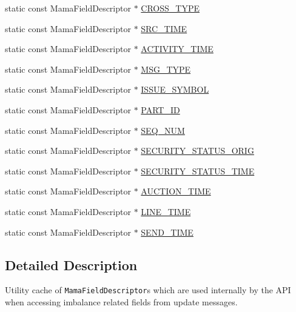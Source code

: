 \begin{CompactItemize}
\item 
static const Mama\-Field\-Descriptor $\ast$ \hyperlink{classWombat_1_1MamdaOrderImbalanceFields_75000c868605f1fb02181c7bf938b1e9}{CROSS\_\-TYPE}
\item 
static const Mama\-Field\-Descriptor $\ast$ \hyperlink{classWombat_1_1MamdaOrderImbalanceFields_6560426768aa3558614e47b458e109ea}{SRC\_\-TIME}
\item 
static const Mama\-Field\-Descriptor $\ast$ \hyperlink{classWombat_1_1MamdaOrderImbalanceFields_cdd3953c18f42d338d29d74f59688759}{ACTIVITY\_\-TIME}
\item 
static const Mama\-Field\-Descriptor $\ast$ \hyperlink{classWombat_1_1MamdaOrderImbalanceFields_74a91e529d9147b008ddfce0608764d5}{MSG\_\-TYPE}
\item 
static const Mama\-Field\-Descriptor $\ast$ \hyperlink{classWombat_1_1MamdaOrderImbalanceFields_b564a837fd932d110b2cde5477df1b6d}{ISSUE\_\-SYMBOL}
\item 
static const Mama\-Field\-Descriptor $\ast$ \hyperlink{classWombat_1_1MamdaOrderImbalanceFields_8cb9096c581c0c13566e3f7107d565c2}{PART\_\-ID}
\item 
static const Mama\-Field\-Descriptor $\ast$ \hyperlink{classWombat_1_1MamdaOrderImbalanceFields_28f51cfaed23b3d2083f5c306f68d88e}{SEQ\_\-NUM}
\item 
static const Mama\-Field\-Descriptor $\ast$ \hyperlink{classWombat_1_1MamdaOrderImbalanceFields_1ada5738f73c0759c3bb4c78fb715dea}{SECURITY\_\-STATUS\_\-ORIG}
\item 
static const Mama\-Field\-Descriptor $\ast$ \hyperlink{classWombat_1_1MamdaOrderImbalanceFields_fe6e8c1af3f7177a87268718b948797f}{SECURITY\_\-STATUS\_\-TIME}
\item 
static const Mama\-Field\-Descriptor $\ast$ \hyperlink{classWombat_1_1MamdaOrderImbalanceFields_669f3da9005778673c5950850f4448de}{AUCTION\_\-TIME}
\item 
static const Mama\-Field\-Descriptor $\ast$ \hyperlink{classWombat_1_1MamdaOrderImbalanceFields_a67c444baa249c161165903ed1054b63}{LINE\_\-TIME}
\item 
static const Mama\-Field\-Descriptor $\ast$ \hyperlink{classWombat_1_1MamdaOrderImbalanceFields_873b5bca073a1db9baae3af5983d6a06}{SEND\_\-TIME}
\end{CompactItemize}


\subsection{Detailed Description}
Utility cache of {\tt Mama\-Field\-Descriptor}s which are used internally by the API when accessing imbalance related fields from update messages. 

